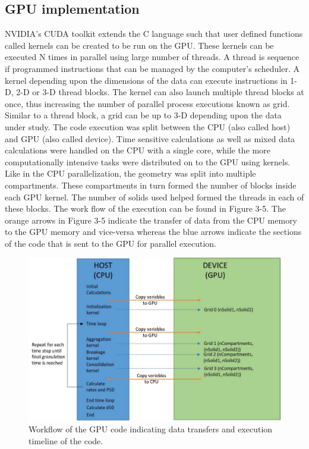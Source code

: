 \documentclass[preprint,10pt,authoryear]{elsarticle}
\begin{document}
\begin{linenumbers}
\subsection{GPU implementation}
NVIDIA’s CUDA toolkit extends the C language such that user defined functions 
called kernels can be created to be run on the GPU. These kernels can be 
executed N times in parallel using large number of threads. A thread is 
sequence if programmed instructions that can be managed by the computer’s 
scheduler. A kernel depending upon the dimensions of the data can execute 
instructions in 1-D, 2-D or 3-D thread blocks. The kernel can also launch 
multiple thread blocks at once, thus increasing the number of parallel 
process executions known as grid. Similar to a thread block, a grid can 
be up to 3-D depending upon the data under study.
The code execution was split between the CPU (also called host) and GPU 
(also called device). Time sensitive calculations as well as mixed data 
calculations were handled on the CPU with a single core, while the more 
computationally intensive tasks were distributed on to the GPU using 
kernels. Like in the CPU parallelization, the geometry was split into 
multiple compartments. These compartments in turn formed the number of 
blocks inside each GPU kernel. The number of solids used helped formed 
the threads in each of these blocks. The work flow of the execution can 
be found in Figure 3-5. The orange arrows in Figure 3-5 indicate the 
transfer of data from the CPU memory to the GPU memory and vice-versa 
whereas the blue arrows indicate the sections of the code that is sent 
to the GPU for parallel execution.

\begin{figure}
\centering
\includegraphics[scale=0.4]{gpuImp_schematic.pdf}
\caption{Workflow of the GPU code indicating data transfers and execution timeline of the code.}
\label{fig:mtd_gpu_imp}
\end{figure}


\end{linenumbers}
\end{document}
